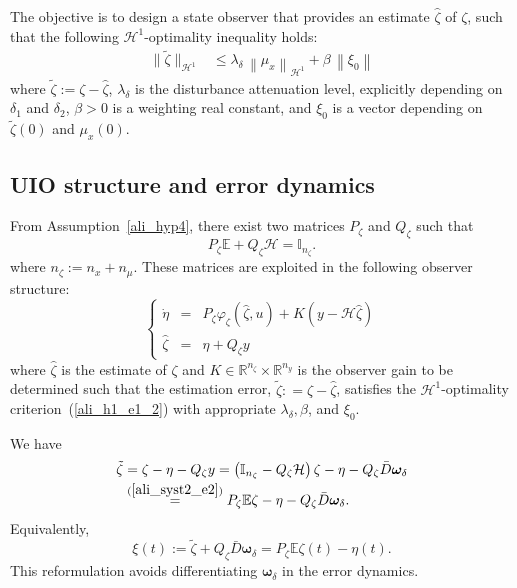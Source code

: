 \documentclass{ifacconf}
\def\eqref#1{(\ref{#1})}
\begin{document}
The objective is to design a state observer that provides an estimate $\hat{\zeta}$ of $\zeta$, such that the following $\mathcal{H}^1$-optimality inequality holds:
%
\begin{align}%
\| \tilde{\zeta} \|_{\mathcal{H}^{1}} &\leq \lambda_{\delta} \, \left\| \mu_{x} \right\|_{\mathcal{H}^{1}}  + \beta \, \left\| \xi_0 \right\| \label{ali_h1_e1_2}
\end{align}
where $\tilde{\zeta} := \zeta - \hat{\zeta}$, $\lambda_{\delta}$ is the disturbance attenuation level, explicitly depending on $\delta_1$ and $\delta_2$, $\beta > 0$ is a weighting real constant, and $\xi_0$ is a vector depending on $\tilde{\zeta}(0)$ and $\mu_{x}(0)$.%
\subsection{UIO structure and error dynamics}
From Assumption~\ref{ali_hyp4},  there exist two matrices $P_{\zeta}$ and $Q_{\zeta}$ such that
\begin{equation}\label{ali_syst2_e2}
 P_{\zeta} \mathbb{E} + Q_{\zeta} \mathcal{H} = \mathbb{I}_{n_{\zeta}}.
\end{equation}
where $n_{\zeta} := n_{x} + n_{\mu}$. These matrices are exploited in the following observer structure:
\begin{equation}\label{ali_syst2_e3}
\left\{
\begin{array}{rcl}
\dot{\eta} & = & P_{\zeta} \varphi_{\zeta}(\hat{\zeta},u) + K \left( y - \mathcal{H} \hat{\zeta} \right)
\\
\hat{\zeta} & = & \eta + Q_{\zeta} y 
\end{array}
\right.
\end{equation}
where $\hat{\zeta}$ is the estimate of $\zeta$ and $K \in\mathbb{R}^{n_{\zeta}}\times\mathbb{R}^{n_y}$ is the observer gain to be determined such that the estimation error, $\tilde{\zeta} : = \zeta - \hat{\zeta}$, satisfies the $\mathcal{H}^1$-optimality criterion~\eqref{ali_h1_e1_2} with appropriate $\lambda_{\delta}, \beta$, and $\xi_0$.
%

We have
\begin{equation}\label{ali_syst2_e4}
\begin{aligned}
\tilde{\zeta}
&= \zeta-\eta-Q_{\zeta}y
= \left(\mathbb{I}_{n_{\zeta}}-Q_{\zeta}\mathcal{H}\right)\zeta-\eta-Q_{\zeta}\bar{D}\bm{\omega}_{\delta}\\[-0.2em]
&\stackrel{\eqref{ali_syst2_e2}}{=} P_{\zeta}\mathbb{E}\zeta-\eta-Q_{\zeta}\bar{D}\bm{\omega}_{\delta}.
\end{aligned}
\end{equation}
Equivalently,
\begin{equation}\label{ali_syst2_e5}
\xi(t):=\tilde{\zeta}+Q_{\zeta}\bar{D}\bm{\omega}_{\delta}
=P_{\zeta}\mathbb{E}\zeta(t)-\eta(t).
\end{equation}
This reformulation avoids differentiating $\bm{\omega}_{\delta}$ in the error dynamics.
\end{document}
